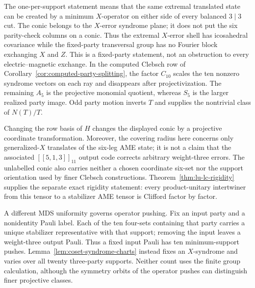 \begin{remark}
\label{rem:clebsch-x-syndrome-boundary}
The one-per-support statement means that the same extremal translated state
can be created by a minimum \(X\)-operator on either side of every balanced
\(3\mid3\) cut.
The conic belongs to the \(X\)-error syndrome plane; it does not put the
six parity-check columns on a conic.  Thus the extremal \(X\)-error shell
has icosahedral covariance while the fixed-party transversal group has no
Fourier block exchanging \(X\) and \(Z\).  This is a fixed-party statement,
not an obstruction to every electric--magnetic exchange.  In the computed
Clebsch row of Corollary~\ref{cor:computed-party-splitting}, the factor
\(C_{10}\) scales the ten nonzero syndrome vectors on each ray and disappears
after projectivization.  The remaining \(A_5\) is the projective monomial
quotient, whereas \(S_5\) is the larger realized party image.  Odd party
motion inverts \(T\) and supplies the nontrivial class of \(N(T)/T\).

Changing the row basis of \(H\) changes the displayed conic by a projective
coordinate transformation.  Moreover, the covering radius here concerns
only generalized-\(X\) translates of the six-leg AME state; it is not a
claim that the associated \([[5,1,3]]_{11}\) output code corrects arbitrary
weight-three errors.  The unlabelled conic also carries neither a chosen
coordinate six-set nor the support orientation used by finer Clebsch
constructions.  Theorem~\ref{thm:lu-lc-rigidity} supplies the separate exact
rigidity statement: every product-unitary intertwiner from this tensor to a
stabilizer AME tensor is Clifford factor by factor.
\end{remark}

A different MDS uniformity governs operator pushing.  Fix an input party
and a nonidentity Pauli label.  Each of the ten four-sets containing that
party carries a unique stabilizer representative with that support; removing
the input leaves a weight-three output Pauli.  Thus a fixed input Pauli has
ten minimum-support pushes.  Lemma~\ref{lem:coset-syndrome-charts} instead
fixes an \(X\)-syndrome and varies over all twenty three-party supports.
Neither count uses the finite group calculation, although the symmetry
orbits of the operator pushes can distinguish finer projective classes.
